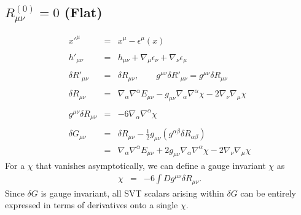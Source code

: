 \documentclass[10pt,letterpaper]{article}
\numberwithin{equation}{section}
\begin{document}
\begin{appendices}
\subsection{$R^{(0)}_{\mu\nu}=0$ (Flat)}
%
\begin{eqnarray}
x'^\mu &=& x^\mu - \epsilon^\mu(x)
\\ \nonumber\\
h'_{\mu\nu} &=&  h_{\mu\nu} + \nabla_\mu\epsilon_\nu + \nabla_\nu \epsilon_\mu 
\\ \nonumber\\
\delta R'_{\mu\nu} &=& \delta R_{\mu\nu},\qquad 
g^{\mu\nu}\delta R'_{\mu\nu} = g^{\mu\nu} \delta R_{\mu\nu}
\\ \nonumber\\
\delta R_{\mu\nu} &=& \nabla_{\alpha }\nabla^{\alpha }E_{\mu \nu } -  g_{\mu \nu } \nabla_{\alpha }\nabla^{\alpha }\chi - 2 \nabla_{\nu }\nabla_{\mu }\chi 
\\ \nonumber\\
g^{\mu\nu}\delta R_{\mu\nu} &=& -6\nabla_\alpha \nabla^\alpha \chi
\\ \nonumber\\
\delta G_{\mu\nu} &=& \delta R_{\mu\nu} -\frac12 g_{\mu\nu}(g^{\alpha\beta} \delta R_{\alpha\beta})
\nonumber\\
&=& \nabla_{\alpha }\nabla^{\alpha }E_{\mu \nu } + 2 g_{\mu \nu } \nabla_{\alpha }\nabla^{\alpha }\chi - 2 \nabla_{\nu }\nabla_{\mu }\chi
\end{eqnarray}
For a $\chi$ that vanishes asymptotically, we can define a gauge invariant $\chi$ as
\begin{eqnarray}
\chi &=& -6\int D g^{\mu\nu}\delta R_{\mu\nu}.
\end{eqnarray}
Since $\delta G$ is gauge invariant, all SVT scalars arising within $\delta G$ can be entirely expressed in terms of derivatives onto a single $\chi$. 


\end{appendices}
\end{document}
